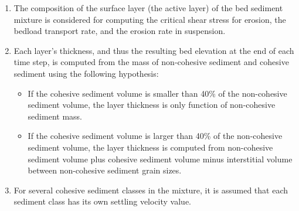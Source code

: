 \begin{enumerate}
\item The composition of the surface layer (the active layer) of the bed sediment mixture is considered for computing the critical shear stress for erosion, the bedload transport rate, and the erosion rate in suspension.
\item Each layer's thickness, and thus the resulting bed elevation at the end of each time step, is computed from the mass of non-cohesive sediment and cohesive sediment using the following hypothesis:
\begin{itemize}
\item If the cohesive sediment volume is smaller than 40\% of the non-cohesive sediment volume, the layer thickness is only function of non-cohesive sediment mass.
\item If the cohesive sediment volume is larger than 40\% of the non-cohesive sediment volume, the layer thickness is computed from non-cohesive sediment volume plus cohesive sediment volume minus interstitial volume between non-cohesive sediment grain sizes.
\end{itemize}
\item For several cohesive sediment classes in the mixture, it is assumed that each sediment class has its own settling velocity value.

\end{enumerate}
